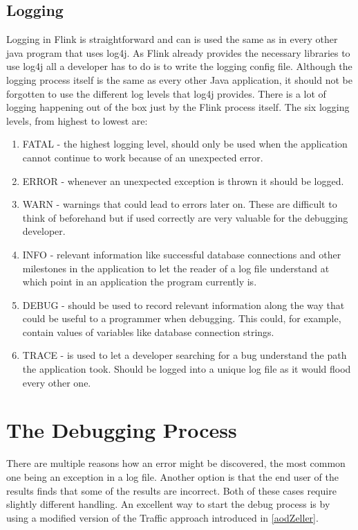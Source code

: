 \subsection{Logging}
Logging in Flink is straightforward and can is used the same as in every other java program that uses log4j. As Flink already provides the necessary libraries to use log4j all a developer has to do is to write the logging config file. Although the logging process itself is the same as every other Java application, it should not be forgotten to use the different log levels that log4j provides. There is a lot of logging happening out of the box just by the Flink process itself. The six logging levels, from highest to lowest are:
\begin{enumerate}
  \item FATAL - the highest logging level, should only be used when the application cannot continue to work because of an unexpected error.
  \item ERROR - whenever an unexpected exception is thrown it should be logged.
  \item WARN - warnings that could lead to errors later on. These are difficult to think of beforehand but if used correctly are very valuable for the debugging developer.
  \item INFO - relevant information like successful database connections and other milestones in the application to let the reader of a log file understand at which point in an application the program currently is.
  \item DEBUG - should be used to record relevant information along the way that could be useful to a programmer when debugging. This could, for example, contain values of variables like database connection strings.
  \item TRACE - is used to let a developer searching for a bug understand the path the application took. Should be logged into a unique log file as it would flood every other one.
\end{enumerate}

\section{The Debugging Process}

There are multiple reasons how an error might be discovered, the most common one being an exception in a log file. Another option is that the end user of the results finds that some of the results are incorrect. Both of these cases require slightly different handling. An excellent way to start the debug process is by using a modified version of the Traffic approach introduced in \ref{aodZeller}.

